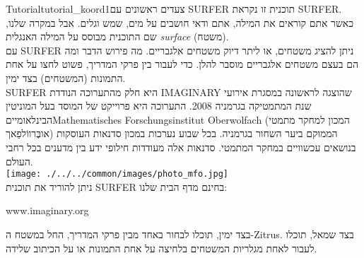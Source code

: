 \begin{surferIntroPage}{Tutorial}{tutorial_koord1}{צעדים ראשונים עם SURFER}
תוכנית זו נקראת SURFER. כאשר אתם קוראים את המילה, אתם ודאי חושבים על מים, שמש וגלים. אבל במקרה שלנו, שם התוכנית מבוסס על המילה האנגלית {\it surface} (משטח).
\\
עם SURFER ניתן להציג משטחים, או ליתר דיוק משטחים אלגבריים. מה פירוש הדבר ומה הם בעצם משטחים אלגבריים מוסבר להלן. כדי לעבור בין פרקי המדריך, פשוט לחצו על אחת התמונות (המשטחים) בצד ימין.\\
SURFER היא חלק מהתערוכה הנודדת IMAGINARY שהוצגה לראשונה במסגרת אירועי שנת המתמטיקה בגרמניה 2008. התערוכה היא פרוייקט של המוסד בעל המוניטין הבינלאומייםMathematisches Forschungsinstitut Oberwolfach (המכון למחקר מתמטי אובֶּרווֹלפַאך) הממוקם ביער השחור בגרמניה. בכל שבוע נערכות במכון סדנאות העוסקות בנושאים עכשוויים במחקר המתמטי. סדנאות אלה מעודדות חילופי ידע בין מדענים בכל רחבי העולם. \\
\vspace{0.2cm} \hspace{3.5cm}\texttt{[image: ./../../common/images/photo\_mfo.jpg]}\\
ניתן להוריד את תוכנית SURFER בחינם מדף הבית שלנו: \\
\begin{centering}
www.imaginary.org\\
\end{centering}
 \vspace{0,2cm}
בצד ימין, תוכלו לבחור באחד מבין פרקי המדריך, החל במשטח ה-Zitrus. בצד שמאל, תוכלו לעבור לאחת מגלריות המשטחים בלחיצה על אחת התמונות או על הכיתוב שלידה.
\end{surferIntroPage}
